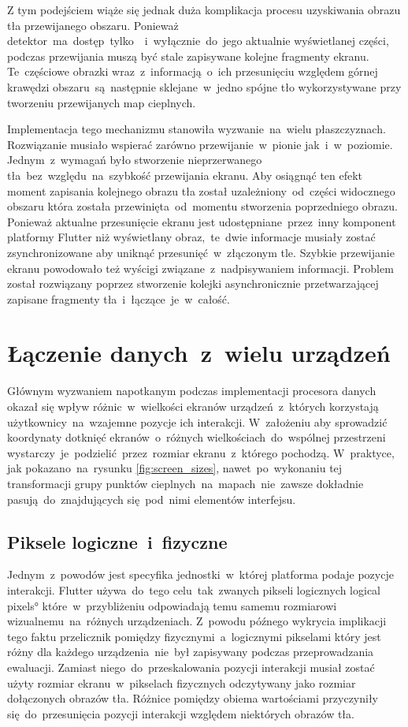 Z tym podejściem wiąże się jednak duża komplikacja procesu uzyskiwania obrazu tła przewijanego obszaru. Ponieważ detektor~ma~dostęp~tylko~~i~wyłącznie~do~jego aktualnie wyświetlanej części, podczas przewijania muszą być stale zapisywane kolejne fragmenty ekranu. Te~częściowe obrazki wraz~z~informacją~o~ich przesunięciu względem górnej krawędzi obszaru~są~następnie sklejane~w~jedno spójne tło wykorzystywane przy tworzeniu przewijanych map cieplnych.

Implementacja tego mechanizmu stanowiła wyzwanie~na~wielu płaszczyznach. Rozwiązanie musiało wspierać zarówno przewijanie~w~pionie jak~i~w~poziomie. Jednym~z~wymagań było stworzenie nieprzerwanego tła~bez~względu~na~szybkość przewijania ekranu. Aby osiągnąć ten efekt moment zapisania kolejnego obrazu tła został uzależniony~od~części widocznego obszaru która została przewinięta~od~momentu stworzenia poprzedniego obrazu. Ponieważ aktualne przesunięcie ekranu jest udostępniane~przez~inny komponent platformy Flutter niż wyświetlany obraz,~te~dwie informacje musiały zostać zsynchronizowane aby uniknąć przesunięć~w~złączonym tle. Szybkie przewijanie ekranu powodowało też wyścigi związane~z~nadpisywaniem informacji. Problem został rozwiązany poprzez stworzenie kolejki asynchronicznie przetwarzającej zapisane fragmenty tła~i~łączące~je~w~całość.

\section{Łączenie danych~z~wielu urządzeń}
Głównym wyzwaniem napotkanym podczas implementacji procesora danych okazał się wpływ różnic~w~wielkości ekranów urządzeń~z~których korzystają użytkownicy~na~wzajemne pozycje ich interakcji. W~założeniu aby sprowadzić koordynaty dotknięć ekranów~o~różnych wielkościach~do~wspólnej przestrzeni wystarczy~je~podzielić~przez~rozmiar ekranu~z~którego pochodzą. W~praktyce, jak pokazano~na~rysunku \ref{fig:screen_sizes}, nawet~po~wykonaniu tej transformacji grupy punktów cieplnych~na~mapach~nie~zawsze dokładnie pasują~do~znajdujących się~pod~nimi elementów interfejsu. 

\subsection{Piksele logiczne~i~fizyczne}
Jednym~z~powodów jest specyfika jednostki~w~której platforma podaje pozycje interakcji. Flutter używa~do~tego celu~tak~zwanych pikseli logicznych \ang{logical pixels} które~w~przybliżeniu odpowiadają temu samemu rozmiarowi wizualnemu~na~różnych urządzeniach. Z~powodu późnego wykrycia implikacji tego faktu przelicznik pomiędzy fizycznymi~a~logicznymi pikselami który jest różny dla każdego urządzenia~nie~był zapisywany podczas przeprowadzania ewaluacji. Zamiast niego~do~przeskalowania pozycji interakcji musiał zostać użyty rozmiar ekranu~w~pikselach fizycznych odczytywany jako rozmiar dołączonych obrazów tła. Różnice pomiędzy obiema wartościami przyczyniły się~do~przesunięcia pozycji interakcji względem niektórych obrazów tła.

